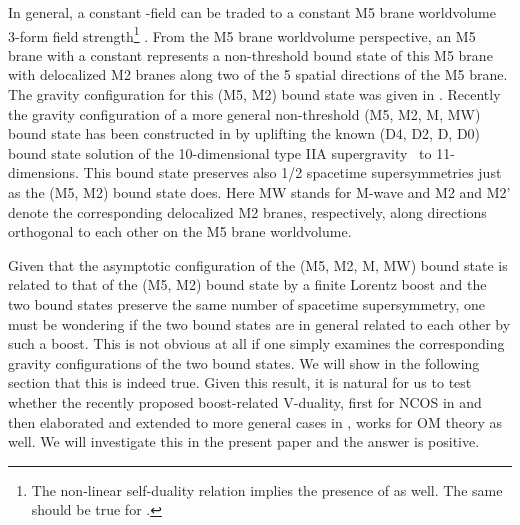 \documentclass[a4paper,12pt]{article}
\begin{document}
In general, a constant \coordHE{}-field  can be traded to a constant M5
brane worldvolume
3-form field strength\footnote{The non-linear self-duality relation
implies the presence of \coordHE{} as well. The same should be true for
\coordHE{}.} \coordHE{}. From the M5 brane worldvolume perspective, an M5
brane with a constant \coordHE{} represents a non-threshold bound state
of this M5 brane with delocalized M2 branes along two of the 5 spatial
directions of the M5 brane. The gravity configuration for this (M5, M2)
bound state was given in \cite{Town}. Recently the gravity configuration
of a more general non-threshold (M5, M2, M\coordHE{}, MW) bound state
 has been constructed in \cite{Berg3} by uplifting 
the known (D4, D2, D\coordHE{}, D0) bound state solution 
of the 10-dimensional type IIA supergravity~\cite{Myer,HO} to 11-dimensions. 
This bound state preserves also 1/2 spacetime supersymmetries just
as the (M5, M2) bound state does. Here MW stands for  M-wave and 
M2 and M2' denote the corresponding delocalized M2 branes, respectively,
along directions orthogonal to each other on the M5 brane worldvolume.

Given that the asymptotic configuration of the (M5, M2, M\coordHE{}, MW) bound
 state is related  to that of the (M5, M2) bound state by a finite
 Lorentz boost and the two bound states preserve the same number of
 spacetime supersymmetry, one must be wondering if the two bound states
are in general related to each other by such a boost. This is not
 obvious at all if one simply examines the corresponding gravity
 configurations of the two bound states.  We will show in the following
section that this is indeed true. Given this result, it is natural for
us to test whether the recently proposed boost-related V-duality, 
first for NCOS in \cite{CW} and then elaborated and extended to more 
general cases in \cite{CLW}, works for OM theory as well. We will 
investigate this in the present paper and the answer is positive.
\end{document}
